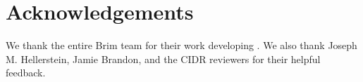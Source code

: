 \section*{Acknowledgements}

We thank the entire Brim team for their work developing \sys{}. We also thank Joseph M. Hellerstein, Jamie Brandon, and the CIDR reviewers for their helpful feedback.

